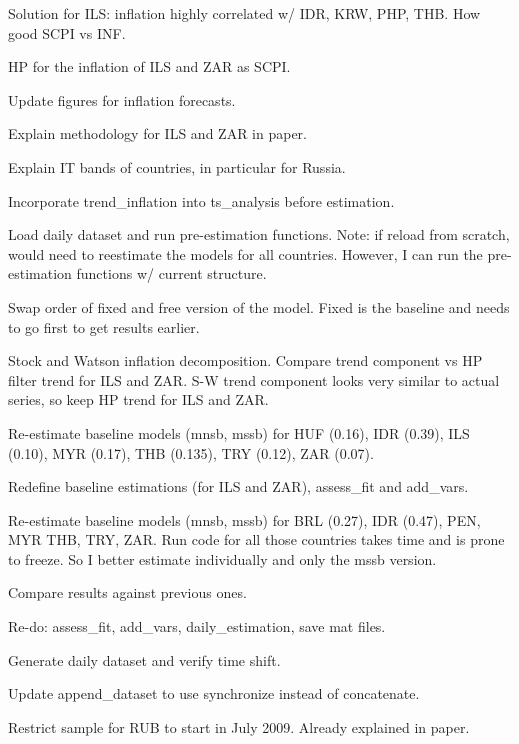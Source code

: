 \documentclass[12pt]{article}
\newcommand{\cmark}{\ding{51}}
\newcommand{\xmark}{\ding{55}}
\newcommand{\done}{\rlap{$\square$}{\raisebox{2pt}{\large\hspace{1pt}\cmark}}%
	\hspace{-2.5pt}}
\newcommand{\wontdo}{\rlap{$\square$}{\large\hspace{1pt}\xmark}}
\begin{document}
\begin{todolist}
\begin{todolist}
		\item[\done] Solution for ILS: inflation highly correlated w/ IDR, KRW, PHP, THB. How good SCPI vs INF.
		\item[\done] HP for the inflation of ILS and ZAR as SCPI.
		\item[\done] Update figures for inflation forecasts.
		\item[\done] Explain methodology for ILS and ZAR in paper.
		\item[\done] Explain IT bands of countries, in particular for Russia.
		\item[\done] Incorporate trend_inflation into ts_analysis before estimation.
		\item[\wontdo] Load daily dataset and run pre-estimation functions. Note: if reload from scratch, would need to reestimate the models for all countries. However, I can run the pre-estimation functions w/ current structure.
		\item[\done] Swap order of fixed and free version of the model. Fixed is the baseline and needs to go first to get results earlier.
		\item[\done] Stock and Watson inflation decomposition. Compare trend component vs HP filter trend for ILS and ZAR.  S-W trend component looks very similar to actual series, so keep HP trend for ILS and ZAR.
		\item[\done] Re-estimate baseline models (mnsb, mssb) for HUF (0.16), IDR (0.39), ILS (0.10), MYR (0.17), THB (0.135), TRY (0.12), ZAR (0.07). 
		\item[\done] Redefine baseline estimations (for ILS and ZAR), assess_fit and add_vars.
		\item[\wontdo] Re-estimate baseline models (mnsb, mssb) for BRL (0.27), IDR (0.47), PEN, MYR THB, TRY, ZAR. Run code for all those countries takes time and is prone to freeze. So I better estimate individually and only the mssb version.
		\item[\done] Compare results against previous ones.
		\item[\done] Re-do: assess_fit, add_vars, daily_estimation, save mat files.
	\end{todolist}
	\item[\done] Generate daily dataset and verify time shift.
	\begin{todolist}
		\item[\done] Update append_dataset to use synchronize instead of concatenate.
		\item[\done] Restrict sample for RUB to start in July 2009. Already explained in paper.

\end{todolist}
\end{todolist}
\end{document}
